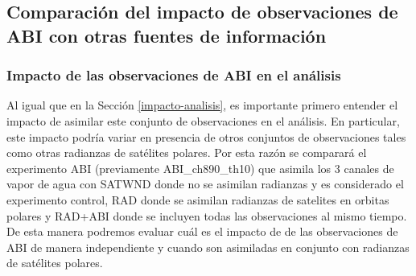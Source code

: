 \documentclass[12pt,oneside,a4paper]{reedthesis}
\begin{document}
\hypertarget{comparaciuxf3n-del-impacto-de-observaciones-de-abi-con-otras-fuentes-de-informaciuxf3n}{%
\subsection{Comparación del impacto de observaciones de ABI con otras fuentes de información}\label{comparaciuxf3n-del-impacto-de-observaciones-de-abi-con-otras-fuentes-de-informaciuxf3n}}

\hypertarget{impacto-de-las-observaciones-de-abi-en-el-anuxe1lisis}{%
\subsubsection{Impacto de las observaciones de ABI en el análisis}\label{impacto-de-las-observaciones-de-abi-en-el-anuxe1lisis}}

Al igual que en la Sección \ref{impacto-analisis}, es importante primero entender el impacto de asimilar este conjunto de observaciones en el análisis. En particular, este impacto podría variar en presencia de otros conjuntos de observaciones tales como otras radianzas de satélites polares. Por esta razón se comparará el experimento ABI (previamente ABI\_ch890\_th10) que asimila los 3 canales de vapor de agua con SATWND donde no se asimilan radianzas y es considerado el experimento control, RAD donde se asimilan radianzas de satelites en orbitas polares y RAD+ABI donde se incluyen todas las observaciones al mismo tiempo. De esta manera podremos evaluar cuál es el impacto de de las observaciones de ABI de manera independiente y cuando son asimiladas en conjunto con radianzas de satélites polares.
\end{document}

